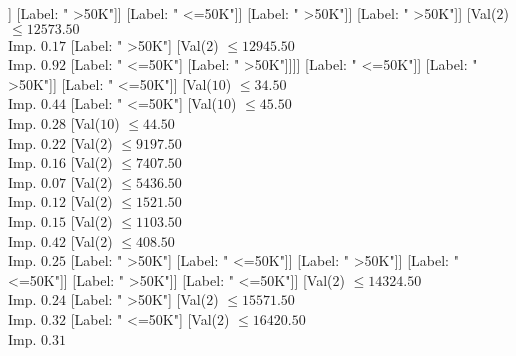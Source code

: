 \documentclass[margin=10pt]{standalone}
\begin{document}
\begin{forest}
							[Val($2$) $ \leq 15318.50$ \\ Imp. $0.02$
								[Val($2$) $ \leq 14633.50$ \\ Imp. $0.07$
									[Val($2$) $ \leq 6507.50$ \\ Imp. $0.02$
										[Val($2$) $ \leq 4397.50$ \\ Imp. $0.03$
											[Val($2$) $ \leq 2626.50$ \\ Imp. $0.07$
												[Val($2$) $ \leq 2608.50$ \\ Imp. $0.26$
													[Val($2$) $ \leq 1373.50$ \\ Imp. $0.19$
														[Val($2$) $ \leq 1200.50$ \\ Imp. $0.92$
															[Label: " >50K"]
															[Label: " <=50K"]]
														[Label: " >50K"]]
													[Label: " <=50K"]]
												[Label: " >50K"]]
											[Label: " >50K"]]
										[Val($2$) $ \leq 12573.50$ \\ Imp. $0.17$
											[Label: " >50K"]
											[Val($2$) $ \leq 12945.50$ \\ Imp. $0.92$
												[Label: " <=50K"]
												[Label: " >50K"]]]]
									[Label: " <=50K"]]
								[Label: " >50K"]]
							[Label: " <=50K"]]
						[Val($10$) $ \leq 34.50$ \\ Imp. $0.44$
							[Label: " <=50K"]
							[Val($10$) $ \leq 45.50$ \\ Imp. $0.28$
								[Val($10$) $ \leq 44.50$ \\ Imp. $0.22$
									[Val($2$) $ \leq 9197.50$ \\ Imp. $0.16$
										[Val($2$) $ \leq 7407.50$ \\ Imp. $0.07$
											[Val($2$) $ \leq 5436.50$ \\ Imp. $0.12$
												[Val($2$) $ \leq 1521.50$ \\ Imp. $0.15$
													[Val($2$) $ \leq 1103.50$ \\ Imp. $0.42$
														[Val($2$) $ \leq 408.50$ \\ Imp. $0.25$
															[Label: " >50K"]
															[Label: " <=50K"]]
														[Label: " >50K"]]
													[Label: " <=50K"]]
												[Label: " >50K"]]
											[Label: " <=50K"]]
										[Val($2$) $ \leq 14324.50$ \\ Imp. $0.24$
											[Label: " >50K"]
											[Val($2$) $ \leq 15571.50$ \\ Imp. $0.32$
												[Label: " <=50K"]
												[Val($2$) $ \leq 16420.50$ \\ Imp. $0.31$

\end{forest}
\end{document}
